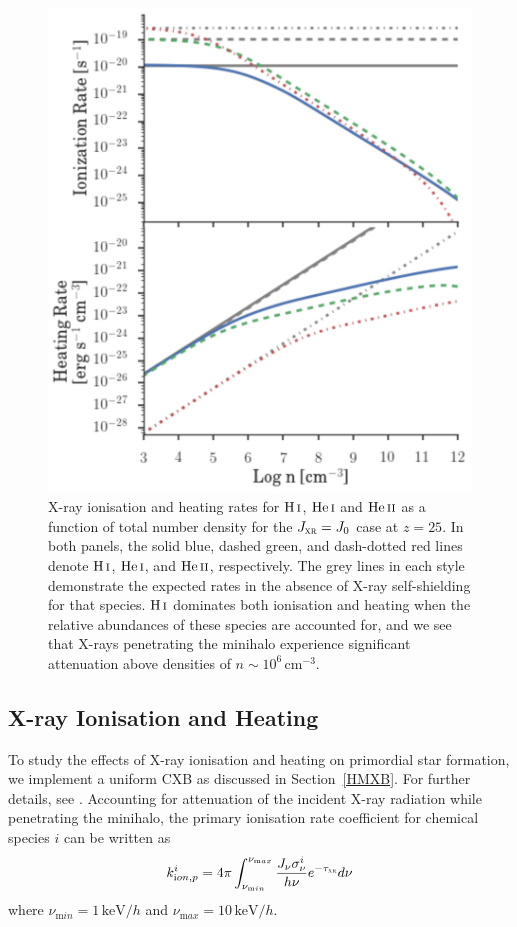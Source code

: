 \documentclass{thesis}
\newcommand{\cc}{\ensuremath{\,\mathrm{cm}^{-3}}\xspace}
\newcommand{\kev}{\ensuremath{\,\mathrm{keV}}\xspace}
\newcommand{\HI}{\ensuremath{\mathrm{H\,\textsc{i}}}\xspace}
\newcommand{\HeI}{\ensuremath{\mathrm{He\,\textsc{i}}}\xspace}
\newcommand{\HeII}{\ensuremath{\mathrm{He\,\textsc{ii}}}\xspace}
\newcommand{\jxr}{\ensuremath{J_{\textsc{xr}}}\xspace}
\newcommand{\RefSec}[1]{\mbox{Section~\ref{#1}}}
\begin{document}
\begin{figure}
\begin{center}
\includegraphics[width=\columnwidth]{figures/khrates/khratesXR}
\caption{\label{fig:khratesXR}
X-ray ionisation and heating rates for \HI, \HeI and \HeII as a function of total number density for the $\jxr=J_0$ case at $z=25$. In both panels, the solid blue, dashed green, and dash-dotted red lines denote \HI, \HeI, and \HeII, respectively.  The grey lines in each style demonstrate the expected rates in the absence of X-ray self-shielding for that species.  \HI dominates both ionisation and heating when the relative abundances of these species are accounted for, and we see that X-rays penetrating the minihalo experience significant attenuation above densities of $n\sim10^6\cc$.}
\end{center}
\end{figure}

\subsection{X-ray Ionisation and Heating}
\label{xrays}
To study the effects of X-ray ionisation and heating on primordial star formation, we implement a uniform CXB as discussed in \RefSec{HMXB}. For further details, see \citet{Jeonetal2012, Jeonetal2014a}. Accounting for attenuation of the incident X-ray radiation while penetrating the minihalo, the primary ionisation rate coefficient for chemical species $i$ can be written as 
\begin{equation}
k^i_{\mathrm ion, p} = 4\pi \int_{\nu_{\mathrm min}}^{\nu_{\mathrm max}}
\frac{J_{\nu} \sigma^i_{\nu}}{h \nu} e^{-\tau_{\textsc{xr}}} d\nu
\end{equation}
where $\nu_{\mathrm min} = 1\kev/h$ and $\nu_{\mathrm max} = 10\kev/h$.  
\end{document}
